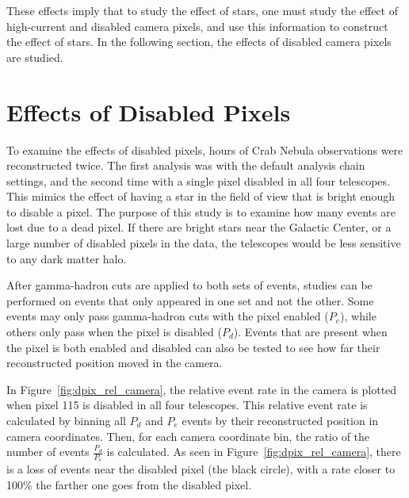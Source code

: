   These effects imply that to study the effect of stars, one must study the effect of high-current and disabled camera pixels, and use this information to construct the effect of stars.
  In the following section, the effects of disabled camera pixels are studied.

\section{Effects of Disabled Pixels}

To examine the effects of disabled pixels,  hours of Crab Nebula observations were reconstructed twice.
The first analysis was with the default analysis chain settings, and the second time with a single pixel disabled in all four telescopes.
This mimics the effect of having a star in the field of view that is bright enough to disable a pixel.
The purpose of this study is to examine how many events are lost due to a dead pixel.
If there are bright stars near the Galactic Center, or a large number of disabled pixels in the data, the telescopes would be less sensitive to any dark matter halo.

After gamma-hadron cuts are applied to both sets of events, studies can be performed on events that only appeared in one set and not the other.
Some events may only pass gamma-hadron cuts with the pixel enabled ($P_e$), while others only pass when the pixel is disabled ($P_d$).
Events that are present when the pixel is both enabled and disabled can also be tested to see how far their reconstructed position moved in the camera.

In Figure~\ref{fig:dpix_rel_camera}, the relative event rate in the camera is plotted when pixel 115 is disabled in all four telescopes.
This relative event rate is calculated by binning all $P_d$ and $P_e$ events by their reconstructed position in camera coordinates.
Then, for each camera coordinate bin, the ratio of the number of events $\frac{P_d}{P_e}$ is calculated.
As seen in Figure~\ref{fig:dpix_rel_camera}, there is a loss of events near the disabled pixel (the black circle), with a rate closer to 100\% the farther one goes from the disabled pixel.

